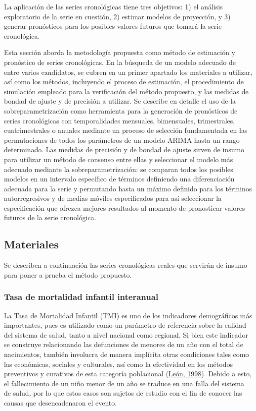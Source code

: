 \documentclass[
]{article}
\begin{document}
La aplicación de las series cronológicas tiene tres objetivos: 1) el
análisis exploratorio de la serie en cuestión, 2) estimar modelos de
proyección, y 3) generar pronósticos para los posibles valores futuros
que tomará la serie cronológica.

Esta sección aborda la metodología propuesta como método de estimación y
pronóstico de series cronológicas. En la búsqueda de un modelo adecuado
de entre varios candidatos, se cubren en un primer apartado los
materiales a utilizar, así como los métodos, incluyendo el proceso de
estimación, el procedimiento de simulación empleado para la verificación
del método propuesto, y las medidas de bondad de ajuste y de precisión a
utilizar. Se describe en detalle el uso de la sobreparametrización como
herramienta para la generación de pronósticos de series cronológicas con
temporalidades mensuales, bimensuales, trimestrales, cuatrimestrales o
anuales mediante un proceso de selección fundamentada en las
permutaciones de todos los parámetros de un modelo ARIMA hasta un rango
determinado. Las medidas de precisión y de bondad de ajuste sirven de
insumo para utilizar un método de consenso entre ellas y seleccionar el
modelo más adecuado mediante la sobreparametrización: se comparan todos
los posibles modelos en un intervalo específico de términos definiendo
una diferenciación adecuada para la serie y permutando hasta un máximo
definido para los términos autorregresivos y de medias móviles
especificados para así seleccionar la especificación que ofrezca mejores
resultados al momento de pronosticar valores futuros de la serie
cronológica.

\subsection{Materiales}

Se describen a continuación las series cronológicas reales que servirán
de insumo para poner a prueba el método propuesto.

\subsubsection{Tasa de mortalidad infantil interanual}

La Tasa de Mortalidad Infantil (TMI) es uno de los indicadores
demográficos más importantes, pues es utilizado como un parámetro de
referencia sobre la calidad del sistema de salud, tanto a nivel nacional
como regional. Si bien este indicador se construye relacionando las
defunciones de menores de un año con el total de nacimientos, también
involucra de manera implícita otras condiciones tales como las
económicas, sociales y culturales, así como la efectividad en los
métodos preventivos y curativos de esta categoría poblacional
(\protect\hyperlink{ref-leon}{León, 1998}). Debido a esto, el
fallecimiento de un niño menor de un año se traduce en una falla del
sistema de salud, por lo que estos casos son sujetos de estudio con el
fin de conocer las causas que desencadenaron el evento.
\end{document}
